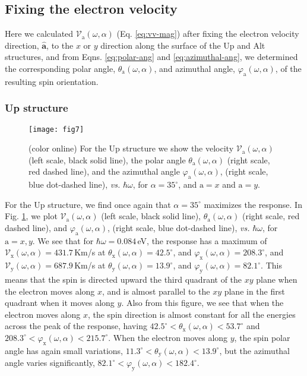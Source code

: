 \documentclass[floatfix,prb,aps,superscriptaddress,showpacs,11pt,preprint,letterpaper]{revtex4}
\def\tama{10cm}
\begin{document}
\subsection{Fixing the electron velocity} 
\label{sec:res-fixvel}

Here we calculated $\mathcal{V}_{\mathrm{a}}(\omega,\alpha)$ (Eq. 
\eqref{eq:vv-mag}) after fixing the electron velocity direction, $\hat{\mathbf{a}}$,
to the $x$ or $y$ direction along the surface of the Up and Alt structures,
and from Eqns. \eqref{eq:polar-ang} and \eqref{eq:azimuthal-ang}, 
we
determined the corresponding polar angle, $\theta_{\mathrm{a}}
(\omega,\alpha)$, and azimuthal angle, $\varphi_{\mathrm{a}}
(\omega,\alpha)$, of the resulting spin orientation.

\subsubsection{Up structure}

\begin{figure}[t]
\centering
\texttt{[image: fig7]}
\caption{(color online) For the Up structure we show the velocity
$\mathcal{V}_{\mathrm{a}} (\omega,\alpha)$ (left scale, black solid line), the polar
angle $\theta_{\mathrm{a}} (\omega,\alpha)$ (right scale, red dashed  line), and  the
azimuthal angle $\varphi_{\mathrm{a}} (\omega,\alpha)$, (right scale, blue dot-dashed 
line), {\it vs.} $\hbar\omega$, for $\alpha=35^\circ$, and $\mathrm{a}=x$ and
$\mathrm{a}=y$.}
\label{fig:up-vab-comp-rtp-1}
\end{figure}

For the Up structure, we find once again that  $\alpha=35^{\circ}$ maximizes
the response. In Fig. \ref{fig:up-vab-comp-rtp-1}, we plot
$\mathcal{V}_{\mathrm{a}} (\omega,\alpha)$ (left scale, black solid line),
$\theta_{\mathrm{a}} (\omega,\alpha)$ (right scale, red dashed  line), and
$\varphi_{\mathrm{a}} (\omega,\alpha)$, (right scale, blue dot-dashed  line), {\it vs.}
$\hbar\omega$, for $\mathrm{a}=x,y$. We see that for $\hbar\omega=0.084$\,eV,
the response has a maximum of $\mathcal{V}_{\mathrm{x}}
(\omega,\alpha)=431.7$\,Km/s at $\theta_{\mathrm{x}}(\omega,\alpha) =
42.5^{\circ}$, and $\varphi_{\mathrm{x}}(\omega,\alpha) = 208.3^{\circ}$, and
$\mathcal{V}_{\mathrm{y}} (\omega,\alpha)=687.9$\,Km/s at
$\theta_{\mathrm{y}}(\omega,\alpha) = 13.9^{\circ}$, and $\varphi_{\mathrm{y}}
(\omega,\alpha) = 82.1^{\circ}$. This means that the spin is directed upward
the third quadrant of the $xy$ plane when the electron moves along
$x$, and is almost parallel to the $xy$ plane in the first quadrant
when it moves along $y$. Also from this figure, we see that when the electron
moves along $x$, the spin direction is almost constant for all the energies
across the peak of the response, having $42.5^{\circ}<\theta_{\mathrm{x}}
(\omega,\alpha)<53.7^{\circ}$ and $208.3^{\circ}<\varphi_{\mathrm{x}}
(\omega,\alpha)<215.7^{\circ}$. When the electron moves along $y$, the spin
polar angle has again small variations, $11.3^{\circ}<
\theta_{\mathrm{y}}(\omega,\alpha)<13.9^{\circ}$, but the azimuthal angle
varies significantly, $82.1^{\circ}< \varphi_{\mathrm{y}}
(\omega,\alpha)<182.4^{\circ}$.
\end{document}
